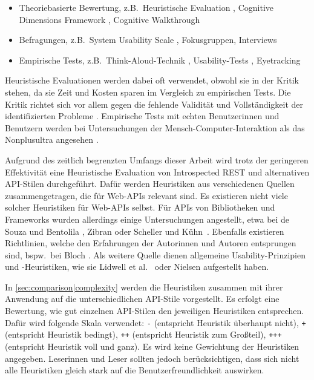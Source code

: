 \begin{itemize}[noitemsep,topsep=0pt]
    \item Theoriebasierte Bewertung, z.B.\ Heuristische Evaluation \autocite{Nielsen1990}, Cognitive Dimensions Framework \autocites{Green1996}{Clarke2003}, Cognitive Walkthrough \autocites{Polson1992}{Blackmon2002}
    \item Befragungen, z.B.\ System Usability Scale \autocite{Brooke1996}, Fokusgruppen, Interviews
    \item Empirische Tests, z.B.\ Think-Aloud-Technik \autocite{Lewis1982}, Usability-Tests \autocite{Nielsen1994}, Eyetracking
\end{itemize}
Heuristische Evaluationen werden dabei oft verwendet, obwohl sie in der Kritik stehen, da sie Zeit und Kosten sparen im Vergleich zu empirischen Tests. Die Kritik richtet sich vor allem gegen die fehlende Validität und Vollständigkeit der identifizierten Probleme \autocites{Kock2009}{Law2004}. Empirische Tests mit echten Benutzerinnen und Benutzern werden bei Untersuchungen der Mensch-Computer-Interaktion als das Nonplusultra angesehen \autocite{Myers2016}.

\para{}Aufgrund des zeitlich begrenzten Umfangs dieser Arbeit wird trotz der geringeren Effektivität eine Heuristische Evaluation von Introspected REST und alternativen API-Stilen durchgeführt. Dafür werden Heuristiken aus verschiedenen Quellen zusammengetragen, die für Web-APIs relevant sind. Es existieren nicht viele solcher Heuristiken für Web-APIs selbst. Für APIs von Bibliotheken und Frameworks wurden allerdings einige Untersuchungen angestellt, etwa bei de Souza und Bentolila \autocite{Souza2009}, Zibran \autocite{Zibran2008} oder Scheller und Kühn\ \autocite{Scheller2015}. Ebenfalls existieren Richtlinien, welche den Erfahrungen der Autorinnen und Autoren entsprungen sind, bspw.\ bei Bloch \autocite{Bloch2006}. Als weitere Quelle dienen allgemeine Usability-Prinzipien und -Heuristiken, wie sie Lidwell et al.\ \autocite{Lidwell2010} oder Nielsen \autocite{Nielsen1994a} aufgestellt haben.

In \cref{sec:comparison|complexity} werden die Heuristiken zusammen mit ihrer Anwendung auf die unterschiedlichen API-Stile vorgestellt. Es erfolgt eine Bewertung, wie gut einzelnen API-Stilen den jeweiligen Heuristiken entsprechen. Dafür wird folgende Skala verwendet: \texttt{-} (entspricht Heuristik überhaupt nicht), \texttt{+} (entspricht Heuristik bedingt), \texttt{++} (entspricht Heuristik zum Großteil), \texttt{+++} (entspricht Heuristik voll und ganz). Es wird keine Gewichtung der Heuristiken angegeben. Leserinnen und Leser sollten jedoch berücksichtigen, dass sich nicht alle Heuristiken gleich stark auf die Benutzerfreundlichkeit auswirken.

